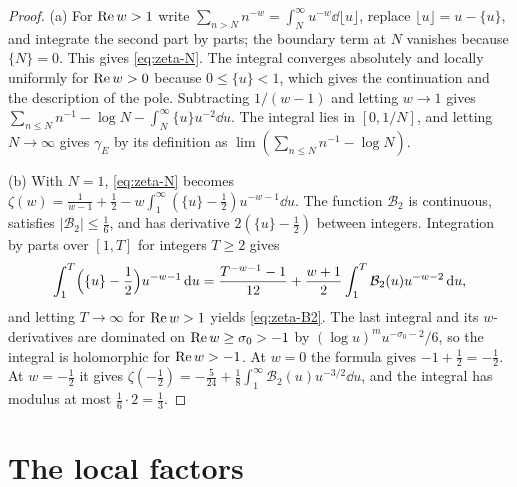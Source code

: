 \begin{proof}
(a) For $\operatorname{Re} w>1$ write $\sum_{n>N}n^{-w}=\int_N^\infty u^{-w}\dd\lfloor u\rfloor$, replace $\lfloor u\rfloor=u-\{u\}$, and integrate the second part by parts; the boundary term at $N$ vanishes because $\{N\}=0$. This gives \eqref{eq:zeta-N}. The integral converges absolutely and locally uniformly for $\operatorname{Re} w>0$ because $0\le\{u\}<1$, which gives the continuation and the description of the pole. Subtracting $1/(w-1)$ and letting $w\to1$ gives $\sum_{n\le N}n^{-1}-\log N-\int_N^\infty\{u\}u^{-2}\dd u$. The integral lies in $[0,1/N]$, and letting $N\to\infty$ gives $\gamma_E$ by its definition as $\lim(\sum_{n\le N}n^{-1}-\log N)$.

(b) With $N=1$, \eqref{eq:zeta-N} becomes $\zeta(w)=\frac1{w-1}+\frac12-w\int_1^\infty(\{u\}-\frac12)u^{-w-1}\dd u$. The function $\mathcal B_2$ is continuous, satisfies $|\mathcal B_2|\le\frac16$, and has derivative $2(\{u\}-\frac12)$ between integers. Integration by parts over $[1,T]$ for integers $T\ge2$ gives
\[
\int_1^T\Bigl(\{u\}-\frac12\Bigr)u^{-w-1}\,\mathrm d u=\frac{T^{-w-1}-1}{12}+\frac{w+1}2\int_1^T\mathcal B_2(u)u^{-w-2}\,\mathrm d u,
\]
and letting $T\to\infty$ for $\operatorname{Re} w>1$ yields \eqref{eq:zeta-B2}. The last integral and its $w$-derivatives are dominated on $\operatorname{Re} w\ge\sigma_0>-1$ by $(\log u)^mu^{-\sigma_0-2}/6$, so the integral is holomorphic for $\operatorname{Re} w>-1$. At $w=0$ the formula gives $-1+\frac12=-\frac12$. At $w=-\frac12$ it gives $\zeta(-\frac12)=-\frac5{24}+\frac18\int_1^\infty\mathcal B_2(u)u^{-3/2}\dd u$, and the integral has modulus at most $\frac16\cdot2=\frac13$.
\end{proof}

\section{The local factors}

